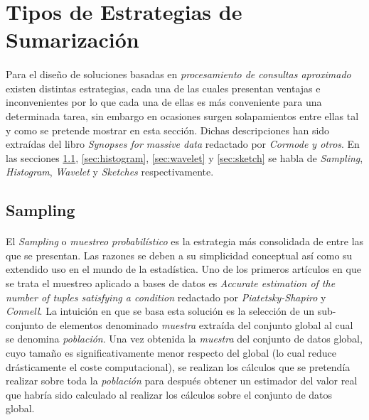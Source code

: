 \documentclass{subfiles}
\begin{document}
    \section{Tipos de Estrategias de Sumarización}
    \label{sec:summaries_types}

      \paragraph{}
      Para el diseño de soluciones basadas en \emph{procesamiento de consultas aproximado} existen distintas estrategias, cada una de las cuales presentan ventajas e inconvenientes por lo que cada una de ellas es más conveniente para una determinada tarea, sin embargo en ocasiones surgen solapamientos entre ellas tal y como se pretende mostrar en esta sección. Dichas descripciones han sido extraídas del libro \emph{Synopses for massive data} \cite{cormode2012synopses} redactado por \emph{Cormode y otros}. En las secciones \ref{sec:sampling}, \ref{sec:histogram}, \ref{sec:wavelet} y \ref{sec:sketch} se habla de \emph{Sampling}, \emph{Histogram}, \emph{Wavelet} y \emph{Sketches} respectivamente.

      \subsection{Sampling}
      \label{sec:sampling}

        \paragraph{}
        El \emph{Sampling} o \emph{muestreo probabilístico} es la estrategia más consolidada de entre las que se presentan. Las razones se deben a su simplicidad conceptual así como su extendido uso en el mundo de la estadística. Uno de los primeros artículos en que se trata el muestreo aplicado a bases de datos es \emph{Accurate estimation of the number of tuples satisfying a condition} \cite{piatetsky1984accurate} redactado por \emph{Piatetsky-Shapiro} y \emph{Connell}. La intuición en que se basa esta solución es la selección de un sub-conjunto de elementos denominado \emph{muestra} extraída del conjunto global al cual se denomina \emph{población}. Una vez obtenida la \emph{muestra} del conjunto de datos global, cuyo tamaño es significativamente menor respecto del global (lo cual reduce drásticamente el coste computacional), se realizan los cálculos que se pretendía realizar sobre toda la \emph{población} para después obtener un estimador del valor real que habría sido calculado al realizar los cálculos sobre el conjunto de datos global.
\end{document}
